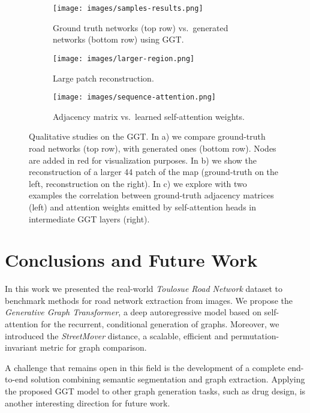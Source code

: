 \documentclass{article}
\begin{document}
\vskip -0.05in
\begin{figure}[h]
    \centering
    \begin{subfigure}[b]{\textwidth}
        \centering
        \texttt{[image: images/samples-results.png]}
        \vskip -0.05in
        \caption{Ground truth networks (top row) vs.~generated networks (bottom row) using GGT.}
        \label{fig:sub-a}
    \end{subfigure}
    \begin{subfigure}[b]{0.313\textwidth}
        \centering
        \texttt{[image: images/larger-region.png]}
        \vskip -0.05in
        \caption{Large patch reconstruction.}
        \vskip 0.1in
        \label{fig:sub-b}
    \end{subfigure}
    \begin{subfigure}[b]{0.68\textwidth}
        \centering
        \texttt{[image: images/sequence-attention.png]}
        \vskip -0.05in
        \caption{Adjacency matrix vs.~learned self-attention weights.}
        \vskip 0.1in
        \label{fig:sub-c}
    \end{subfigure}
    \vskip -0.15in
\caption{Qualitative studies on the GGT. In a) we compare ground-truth road networks (top row), with generated ones (bottom row). Nodes are added in red for visualization purposes. In b) we show the reconstruction of a larger 44 patch of the map (ground-truth on the left, reconstruction on the right). In c) we explore with two examples the correlation between ground-truth adjacency matrices (left) and attention weights emitted by self-attention heads in intermediate GGT layers (right).}
    \label{fig:results}
    \vskip -0.15in
    \end{figure}
    



\section{Conclusions and Future Work}
\vskip -0.05in
In this work we presented the real-world \textit{Toulosue Road Network} dataset to benchmark methods for road network extraction from images. We propose the \textit{Generative Graph Transformer}, a deep autoregressive model based on self-attention for the recurrent, conditional generation of graphs. Moreover, we introduced the \textit{StreetMover} distance, a scalable, efficient and permutation-invariant metric for graph comparison. 

A challenge that remains open in this field is the development of a complete end-to-end solution combining semantic segmentation and graph extraction. Applying the proposed GGT model to other graph generation tasks, such as drug design, is another interesting direction for future work.
\end{document}
